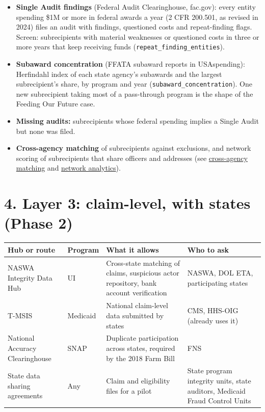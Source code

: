 \documentclass[letterpaper,11pt]{article}
\providecommand{\tightlist}{\setlength{\itemsep}{0pt}\setlength{\parskip}{0pt}}
\begin{document}
\begin{itemize}
\tightlist
\item
  \textbf{Single Audit findings} (Federal Audit Clearinghouse, fac.gov):
  every entity spending \$1M or more in federal awards a year (2 CFR
  200.501, as revised in 2024) files an audit with findings, questioned
  costs and repeat-finding flags. Screen: subrecipients with material
  weaknesses or questioned costs in three or more years that keep
  receiving funds (\texttt{repeat\_finding\_entities}).
\item
  \textbf{Subaward concentration} (FFATA subaward reports in
  USAspending): Herfindahl index of each state agency's subawards and
  the largest subrecipient's share, by program and year
  (\texttt{subaward\_concentration}). One new subrecipient taking most
  of a pass-through program is the shape of the Feeding Our Future case.
\item
  \textbf{Missing audits:} subrecipients whose federal spending implies
  a Single Audit but none was filed.
\item
  \textbf{Cross-agency matching} of subrecipients against exclusions,
  and network scoring of subrecipients that share officers and addresses
  (see \href{../playbook/cross_agency_matching.pdf}{cross-agency
  matching} and \href{../playbook/network_analytics.pdf}{network
  analytics}).
\end{itemize}

\hypertarget{layer-3-claim-level-with-states-phase-2}{%
\section*{4. Layer 3: claim-level, with states (Phase
2)}\label{layer-3-claim-level-with-states-phase-2}}

\begingroup\small\setlength{\tabcolsep}{4pt}\renewcommand{\arraystretch}{1.25}
\begin{longtable}[l]{@{}>{\raggedright\arraybackslash}p{}l>{\raggedright\arraybackslash}p{}>{\raggedright\arraybackslash}p{}@{}}
\rowcolor{coolblack}\leavevmode\color{white}\bfseries Hub or route & \leavevmode\color{white}\bfseries Program & \leavevmode\color{white}\bfseries What it allows & \leavevmode\color{white}\bfseries Who to ask \\
\endhead
NASWA Integrity Data Hub & UI & Cross-state matching of claims, suspicious actor repository, bank account verification & NASWA, DOL ETA, participating states \\
T-MSIS & Medicaid & National claim-level data submitted by states & CMS, HHS-OIG (already uses it) \\
National Accuracy Clearinghouse & SNAP & Duplicate participation across states, required by the 2018 Farm Bill & FNS \\
State data sharing agreements & Any & Claim and eligibility files for a pilot & State program integrity units, state auditors, Medicaid Fraud Control Units \\
\end{longtable}\endgroup
\end{document}
